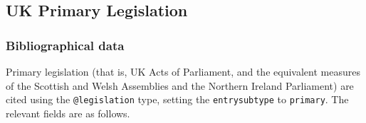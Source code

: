 \documentclass[a4paper,
               11pt,
	       DIV=1,			   
	       footinclude=false]
	      {scrartcl}
\begin{document}
\subsection{UK Primary Legislation}

\subsubsection{Bibliographical data}
Primary legislation (that is, UK Acts of Parliament, and the
equivalent measures of the Scottish and Welsh Assemblies and the
Northern Ireland Parliament) are cited using the \texttt{@legislation}
type, setting the \texttt{entrysubtype} to \texttt{primary}. The
relevant fields are as follows.
\end{document}
